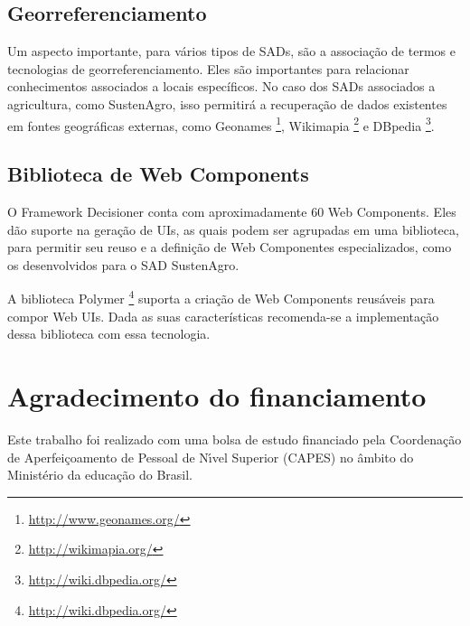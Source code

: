 \subsection*{Georreferenciamento}

Um aspecto importante, para vários tipos de SADs, são a associação
de termos e tecnologias de georreferenciamento. Eles são importantes
para relacionar conhecimentos associados a locais específicos. No
caso dos SADs associados a agricultura, como SustenAgro, isso permitirá
a recuperação de dados existentes em fontes geográficas externas,
como \foreignlanguage{english}{Geonames} \footnote{ \url{http://www.geonames.org/}},
\foreignlanguage{english}{Wikimapia} \footnote{ \url{http://wikimapia.org/}}
e \foreignlanguage{english}{DBpedia} \footnote{ \url{http://wiki.dbpedia.org/}}. 

\subsection*{Biblioteca de \foreignlanguage{english}{Web Components}}

O Framework Decisioner conta com aproximadamente 60 \foreignlanguage{english}{Web
Components}. Eles dão suporte na geração de UIs, as quais podem ser
agrupadas em uma biblioteca, para permitir seu reuso e a definição
de Web Componentes especializados, como os desenvolvidos para o SAD
SustenAgro.

A biblioteca \foreignlanguage{english}{Polymer} \footnote{ \url{http://wiki.dbpedia.org/}}
suporta a criação de \foreignlanguage{english}{Web Components} reusáveis
para compor Web UIs. Dada as suas características recomenda-se a implementação
dessa biblioteca com essa tecnologia. 

\subsection*{}


\section{Agradecimento do financiamento}

Este trabalho foi realizado com uma bolsa de estudo financiado pela
Coordenação de Aperfeiçoamento de Pessoal de N\'{ı}vel Superior (CAPES)
no âmbito do Ministério da educação do Brasil.
